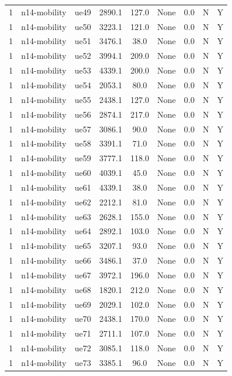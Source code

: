 \begin{table}[ht]
\begin{tabular}{|c|c|c|c|c|c|c|c|c|}
1 & n14-mobility & ue49 & 2890.1 & 127.0 & None & 0.0 & N & Y \\
1 & n14-mobility & ue50 & 3223.1 & 121.0 & None & 0.0 & N & Y \\
1 & n14-mobility & ue51 & 3476.1 & 38.0 & None & 0.0 & N & Y \\
1 & n14-mobility & ue52 & 3994.1 & 209.0 & None & 0.0 & N & Y \\
1 & n14-mobility & ue53 & 4339.1 & 200.0 & None & 0.0 & N & Y \\
1 & n14-mobility & ue54 & 2053.1 & 80.0 & None & 0.0 & N & Y \\
1 & n14-mobility & ue55 & 2438.1 & 127.0 & None & 0.0 & N & Y \\
1 & n14-mobility & ue56 & 2874.1 & 217.0 & None & 0.0 & N & Y \\
1 & n14-mobility & ue57 & 3086.1 & 90.0 & None & 0.0 & N & Y \\
1 & n14-mobility & ue58 & 3391.1 & 71.0 & None & 0.0 & N & Y \\
1 & n14-mobility & ue59 & 3777.1 & 118.0 & None & 0.0 & N & Y \\
1 & n14-mobility & ue60 & 4039.1 & 45.0 & None & 0.0 & N & Y \\
1 & n14-mobility & ue61 & 4339.1 & 38.0 & None & 0.0 & N & Y \\
1 & n14-mobility & ue62 & 2212.1 & 81.0 & None & 0.0 & N & Y \\
1 & n14-mobility & ue63 & 2628.1 & 155.0 & None & 0.0 & N & Y \\
1 & n14-mobility & ue64 & 2892.1 & 103.0 & None & 0.0 & N & Y \\
1 & n14-mobility & ue65 & 3207.1 & 93.0 & None & 0.0 & N & Y \\
1 & n14-mobility & ue66 & 3486.1 & 37.0 & None & 0.0 & N & Y \\
1 & n14-mobility & ue67 & 3972.1 & 196.0 & None & 0.0 & N & Y \\
1 & n14-mobility & ue68 & 1820.1 & 212.0 & None & 0.0 & N & Y \\
1 & n14-mobility & ue69 & 2029.1 & 102.0 & None & 0.0 & N & Y \\
1 & n14-mobility & ue70 & 2438.1 & 170.0 & None & 0.0 & N & Y \\
1 & n14-mobility & ue71 & 2711.1 & 107.0 & None & 0.0 & N & Y \\
1 & n14-mobility & ue72 & 3085.1 & 118.0 & None & 0.0 & N & Y \\
1 & n14-mobility & ue73 & 3385.1 & 96.0 & None & 0.0 & N & Y \\

\end{tabular}
\end{table}

